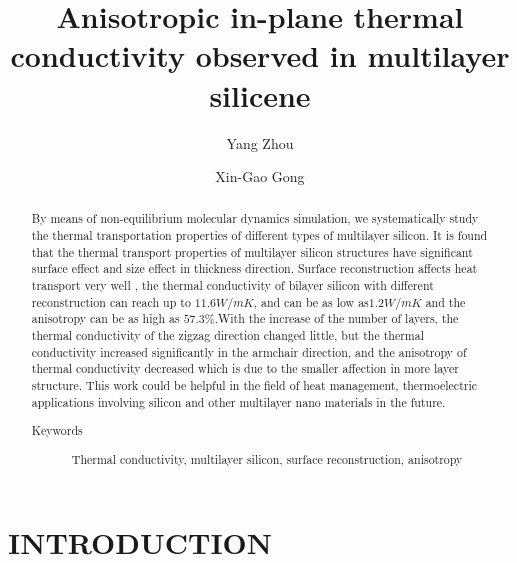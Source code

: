 \documentclass[%
 reprint,
 amsmath,amssymb,
 aps,
prb,
]{revtex4-1}
\begin{document}
\title{Anisotropic in-plane thermal conductivity observed in multilayer silicene}
\author{Yang Zhou}
\author{Xin-Gao Gong}%
%
\begin{abstract}
By means of non-equilibrium molecular dynamics simulation, we systematically study the thermal transportation properties of different types of multilayer silicon. It is found that the thermal transport properties of multilayer silicon structures have significant surface effect and size effect in thickness direction. Surface reconstruction affects heat transport very well , the thermal conductivity of bilayer silicon with different reconstruction can reach up to $11.6 W/mK$, and can be as low as$ 1.2 W/mK$ and the anisotropy can be as high as $57.3\%$.With the increase of the number of layers, the thermal conductivity of the zigzag direction changed little, but the thermal conductivity increased significantly in the armchair direction, and the anisotropy of thermal conductivity decreased which is due to the smaller affection in more layer structure. This work could be helpful in the field of heat management, thermoelectric applications involving silicon and other multilayer nano materials in the future.
\begin{description}
\item[Keywords]
Thermal conductivity, multilayer silicon, surface reconstruction, anisotropy
\end{description}
\end{abstract}

\maketitle

\section{INTRODUCTION}
\end{document}
